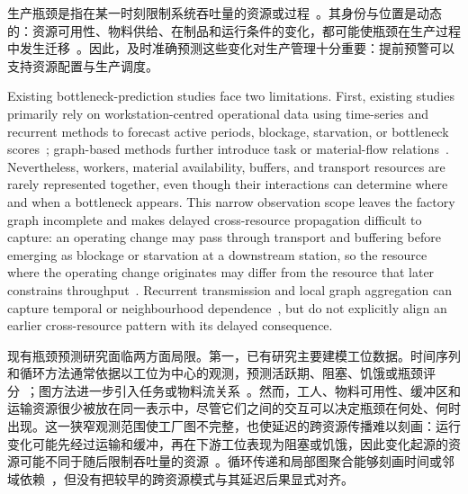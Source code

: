 \documentclass[a4paper,fleqn]{cas-dc}
\newcommand{\zhpara}[1]{%
  \par\begingroup\small\color{black!72}\noindent #1\par\endgroup}
\begin{document}
\zhpara{生产瓶颈是指在某一时刻限制系统吞吐量的资源或过程~\cite{subramaniyan2023throughput,tang2024comprehensive}。其身份与位置是动态的：资源可用性、物料供给、在制品和运行条件的变化，都可能使瓶颈在生产过程中发生迁移~\cite{lai2021data}。因此，及时准确预测这些变化对生产管理十分重要：提前预警可以支持资源配置与生产调度。}


Existing bottleneck-prediction studies face two limitations. First, existing studies primarily rely on workstation-centred operational data using time-series and recurrent methods to forecast active periods, blockage, starvation, or bottleneck scores~\cite{li2011throughput,subramaniyan2018data,lai2018twolayer,liu2023lstmdam}; graph-based methods further introduce task or material-flow relations~\cite{lai2023bstan,yin2025btgcn,ma2023tusb,cen2025dstnn,wu2025knowledge}. Nevertheless, workers, material availability, buffers, and transport resources are rarely represented together, even though their interactions can determine where and when a bottleneck appears. This narrow observation scope leaves the factory graph incomplete and makes delayed cross-resource propagation difficult to capture: an operating change may pass through transport and buffering before emerging as blockage or starvation at a downstream station, so the resource where the operating change originates may differ from the resource that later constrains throughput~\cite{gu2015passive,zhang2022vulnerability}. Recurrent transmission and local graph aggregation can capture temporal or neighbourhood dependence~\cite{liu2023lstmdam,yin2025btgcn}, but do not explicitly align an earlier cross-resource pattern with its delayed consequence.

\zhpara{现有瓶颈预测研究面临两方面局限。第一，已有研究主要建模工位数据。时间序列和循环方法通常依据以工位为中心的观测，预测活跃期、阻塞、饥饿或瓶颈评分~\cite{li2011throughput,subramaniyan2018data,lai2018twolayer,liu2023lstmdam}；图方法进一步引入任务或物料流关系~\cite{lai2023bstan,yin2025btgcn,ma2023tusb,cen2025dstnn,wu2025knowledge}。然而，工人、物料可用性、缓冲区和运输资源很少被放在同一表示中，尽管它们之间的交互可以决定瓶颈在何处、何时出现。这一狭窄观测范围使工厂图不完整，也使延迟的跨资源传播难以刻画：运行变化可能先经过运输和缓冲，再在下游工位表现为阻塞或饥饿，因此变化起源的资源可能不同于随后限制吞吐量的资源~\cite{gu2015passive,zhang2022vulnerability}。循环传递和局部图聚合能够刻画时间或邻域依赖~\cite{liu2023lstmdam,yin2025btgcn}，但没有把较早的跨资源模式与其延迟后果显式对齐。}
\end{document}
